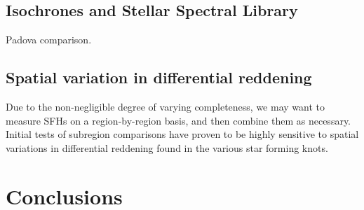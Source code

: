 \documentclass[preprint2]{aastex62}
\begin{document}
\subsection{Isochrones and Stellar Spectral Library}\label{sec:discussion:iso}

Padova comparison.

\subsection{Spatial variation in differential reddening}\label{sec:discussion:dav}

Due to the non-negligible degree of varying completeness, we may want to measure SFHs on a region-by-region basis, and then combine them as necessary. Initial tests of subregion comparisons have proven to be highly sensitive to spatial variations in differential reddening found in the various star forming knots.

\section{Conclusions}\label{sec:conclusions}



\end{document}
